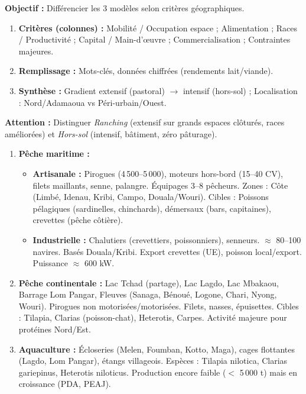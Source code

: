 \documentclass[11pt]{article}
\newcounter{popsec}
\newcounter{popsub}
\newcommand{\courssub}[1]{%
  \stepcounter{popsub}%
  \par\vspace{9pt}\noindent{\popxbold\fontsize{11.5}{13}\selectfont\color{popink}{\color{poporange}\thepopsec.\thepopsub}\hspace{6pt}#1}\par\nopagebreak\vspace{4pt}
}
\begin{document}
\begin{methode}
\textbf{Objectif :} Différencier les 3 modèles selon critères géographiques.
\begin{enumerate}
    \item \textbf{Critères (colonnes) :} Mobilité / Occupation espace ; Alimentation ; Races / Productivité ; Capital / Main-d'œuvre ; Commercialisation ; Contraintes majeures.
    \item \textbf{Remplissage :} Mots-clés, données chiffrées (rendements lait/viande).
    \item \textbf{Synthèse :} Gradient extensif (pastoral) $\to$ intensif (hors-sol) ; Localisation : Nord/Adamaoua vs Péri-urbain/Ouest.
\end{enumerate}
\textbf{Attention :} Distinguer \emph{Ranching} (extensif sur grands espaces clôturés, races améliorées) et \emph{Hors-sol} (intensif, bâtiment, zéro pâturage).
\end{methode}

\courssub{La pêche au Cameroun}

\begin{definition}
\begin{enumerate}
    \item \textbf{Pêche maritime :}
    \begin{itemize}
        \item \textbf{Artisanale :} Pirogues (4\,500--5\,000), moteurs hors-bord (15--40 CV), filets maillants, senne, palangre. Équipages 3--8 pêcheurs. Zones : Côte (Limbé, Idenau, Kribi, Campo, Douala/Wouri). Cibles : Poissons pélagiques (sardinelles, chinchards), démersaux (bars, capitaines), crevettes (pêche côtière).
        \item \textbf{Industrielle :} Chalutiers (crevettiers, poissonniers), senneurs. $\approx$ 80--100 navires. Basés Douala/Kribi. Export crevettes (UE), poisson local/export. Puissance $\approx$ 600 kW.
    \end{itemize}
    \item \textbf{Pêche continentale :} Lac Tchad (partage), Lac Lagdo, Lac Mbakaou, Barrage Lom Pangar, Fleuves (Sanaga, Bénoué, Logone, Chari, Nyong, Wouri). Pirogues non motorisées/motorisées. Filets, nasses, épuisettes. Cibles : Tilapia, Clarias (poisson-chat), Heterotis, Carpes. Activité majeure pour protéines Nord/Est.
    \item \textbf{Aquaculture :} Écloseries (Melen, Foumban, Kotto, Maga), cages flottantes (Lagdo, Lom Pangar), étangs villageois. Espèces : Tilapia nilotica, Clarias gariepinus, Heterotis niloticus. Production encore faible ($<$ 5\,000 t) mais en croissance (PDA, PEAJ).
\end{enumerate}
\end{definition}
\end{document}
